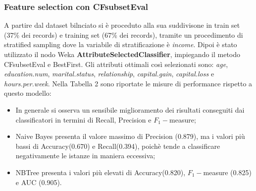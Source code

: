 \documentclass[fleqn,10pt]{SelfArx}
\begin{document}
\subsubsection{Feature selection con CFsubsetEval}
A partire dal dataset bilnciato si è proceduto alla sua suddivisone in train set (37\% dei records) e training set (67\% dei records), tramite un procedimento di stratified sampling dove la variabile di stratificazione è \textit{income}. Dipoi è stato utilizzato il nodo Weka \textbf{AttributeSelectedClassifier}, impiegando il metodo CFsubsetEval e BestFirst. Gli attributi ottimali così selezionati sono: \textit{age}, \textit{education.num}, \textit{marital.status}, \textit{relationship}, \textit{capital.gain}, \textit{capital.loss} e \textit{hours.per.week}.
Nella Tabella 2 sono riportate le misure di performance rispetto a questo modello:
\begin{table}[h!]
\caption{Equal size sampling con CFsubsetEval}
\label{table:holdout}
\end{table}
\begin{itemize}
    \item In generale si osserva un sensibile miglioramento dei risultati conseguiti dai classificatori in termini di Recall, Precision e $F_1-$measure;
    \item Naive Bayes presenta il valore massimo di Precision (0.879), ma i valori più bassi di Accuracy(0.670) e Recall(0.394), poichè tende a classificare negativamente le istanze in maniera eccessiva;
    \item NBTree presenta i valori più elevati di Accuracy(0.820), $F_1-$measure (0.825) e AUC (0.905).
\end{itemize} 
\end{document}
